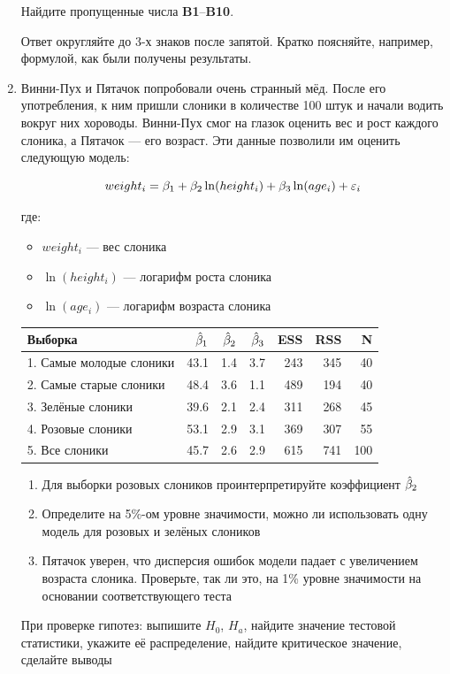 \documentclass[12pt, a4paper]{article}
\begin{document}
\begin{enumerate}
Найдите пропущенные числа \textbf{B1}--\textbf{B10}.

Ответ округляйте до 3-х знаков после запятой. Кратко поясняйте, например, формулой, как были получены результаты.

\item Винни-Пух и Пятачок попробовали очень странный мёд. После его употребления, к ним пришли слоники в количестве 100 штук и начали водить вокруг них хороводы. Винни-Пух смог на глазок оценить вес и рост каждого слоника, а Пятачок — его возраст. Эти данные позволили им оценить следующую модель:

\[
weight_i = \beta_1 + \beta_2 \ln(height_i) + \beta_3 \ln(age_i) + \varepsilon_i
\]

где:
\begin{itemize}
\item $weight_i$ — вес слоника
\item $\ln(height_i)$ — логарифм роста слоника
\item $\ln(age_i)$ — логарифм возраста слоника
\end{itemize}


\begin{tabular}{lrrrrrr} \toprule
Выборка & $\hat{\beta}_1$ & $\hat{\beta}_2$ & $\hat{\beta}_3$ & ESS & RSS & N  \\
\midrule
1. Самые молодые слоники  & 43.1 & 1.4 & 3.7 & 243 & 345 & 40\\
2. Самые старые слоники & 48.4 & 3.6 & 1.1 & 489 & 194 & 40 \\
3. Зелёные слоники & 39.6 & 2.1 & 2.4 & 311 & 268 & 45 \\
4. Розовые слоники & 53.1 & 2.9 & 3.1 & 369 & 307 & 55 \\
5. Все слоники & 45.7 & 2.6 & 2.9 & 615 & 741 & 100 \\
\bottomrule
\end{tabular}


\begin{enumerate}
\item Для выборки розовых слоников проинтерпретируйте коэффициент $\hat{\beta}_2$
\item Определите на 5\%-ом уровне значимости, можно ли использовать одну модель для розовых и зелёных слоников
\item Пятачок уверен, что дисперсия ошибок модели падает с увеличением возраста слоника. Проверьте, так ли это, на 1\% уровне значимости на основании соответствующего теста
\end{enumerate}

При проверке гипотез: выпишите $H_0$, $H_a$, найдите значение тестовой статистики, укажите её распределение, найдите критическое значение, сделайте выводы


\end{enumerate}
\end{document}
